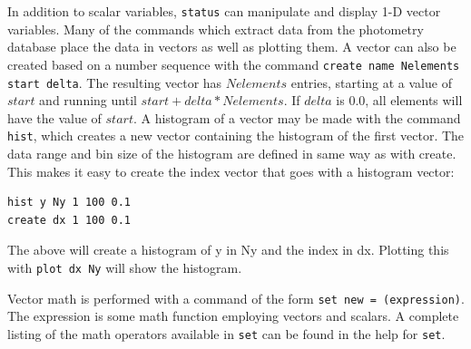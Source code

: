 \documentclass{article}
\begin{document}
In addition to scalar variables, {\tt status} can manipulate and
display 1-D vector variables.  Many of the commands which extract data
from the photometry database place the data in vectors as well as
plotting them.  A vector can also be created based on a number
sequence with the command {\tt create name Nelements start delta}.
The resulting vector has $Nelements$ entries, starting at a value of
$start$ and running until $start + delta*Nelements$.  If $delta$ is
0.0, all elements will have the value of $start$.  A histogram of a vector
may be made with the command {\tt hist}, which creates a new vector
containing the histogram of the first vector.  The data range and bin
size of the histogram are defined in same way as with create.  This
makes it easy to create the index vector that goes with a histogram
vector:  
\begin{verbatim}
hist y Ny 1 100 0.1
create dx 1 100 0.1
\end{verbatim}
The above will create a histogram of y in Ny and the index in dx.
Plotting this with {\tt plot dx Ny} will show the histogram.

Vector math is performed with a command of the form {\tt set new =
  (expression)}.  The expression is some math function employing
vectors and scalars.  A complete listing of the math operators
available in {\tt set} can be found in the help for {\tt set}.
\end{document}
